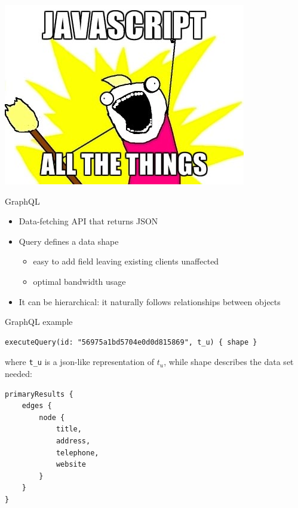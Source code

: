 \documentclass[smaller]{beamer}
\begin{document}
\begin{frame}[label={sec:orgheadline18}]{}
\includegraphics[width=.9\linewidth]{./images/jsatt.jpg} 
\end{frame}

\begin{frame}[label={sec:orgheadline19}]{GraphQL}
\begin{itemize}
\item Data-fetching API that returns JSON
\item Query defines a data shape
\begin{itemize}
\item easy to add field leaving existing clients unaffected
\item optimal bandwidth usage
\end{itemize}
\item It can be hierarchical: it naturally follows relationships between objects
\end{itemize}
\end{frame}

\begin{frame}[fragile,label={sec:orgheadline20}]{GraphQL example}
 \begin{verbatim}
executeQuery(id: "56975a1bd5704e0d0d815869", t_u) { shape }
\end{verbatim}

where \texttt{t\_u} is a json-like representation of \(t_u\), while 
\alert{shape} describes the data set needed:


\begin{verbatim}
primaryResults {
    edges {
        node {
            title,
            address,
            telephone,
            website
        }
    }
}
\end{verbatim}
\end{frame}
\end{document}
